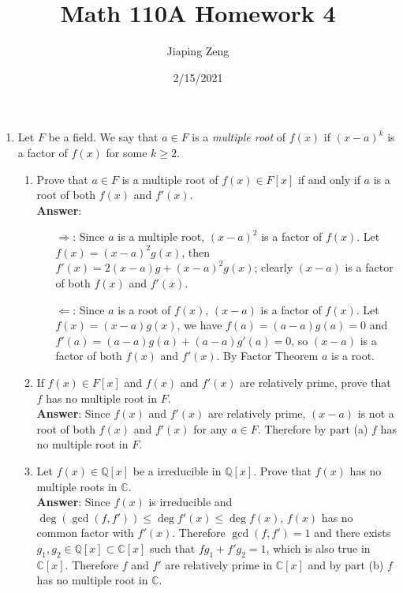 \documentclass{article}
\title{Math 110A Homework 4}
\date{2/15/2021}
\author{Jiaping Zeng}
\begin{document}
\maketitle

\begin{enumerate}
      \item Let $F$ be a field. We say that $a\in F$ is a \textit{multiple root} of $f(x)$ if $(x-a)^k$ is a factor of $f(x)$ for some $k\geq 2$.
            \begin{enumerate}
                  \item Prove that $a\in F$ is a multiple root of $f(x)\in F[x]$ if and only if $a$ is a root of both $f(x)$ and $f'(x)$.\\
                        \textbf{Answer}:
                        \begin{itemize}
                              \item [$\Rightarrow$:] Since $a$ is a multiple root, $(x-a)^2$ is a factor of $f(x)$. Let $f(x)=(x-a)^2g(x)$, then $f'(x)=2(x-a)g+(x-a)^2g(x)$; clearly $(x-a)$ is a factor of both $f(x)$ and $f'(x)$.
                              \item [$\Leftarrow$:] Since $a$ is a root of $f(x)$, $(x-a)$ is a factor of $f(x)$. Let $f(x)=(x-a)g(x)$, we have $f(a)=(a-a)g(a)=0$ and $f'(a)=(a-a)g(a)+(a-a)g'(a)=0$, so $(x-a)$ is a factor of both $f(x)$ and $f'(x)$. By Factor Theorem $a$ is a root.
                        \end{itemize}
                  \item If $f(x)\in F[x]$ and $f(x)$ and $f'(x)$ are relatively prime, prove that $f$ has no multiple root in $F$.\\
                        \textbf{Answer}: Since $f(x)$ and $f'(x)$ are relatively prime, $(x-a)$ is not a root of both $f(x)$ and $f'(x)$ for any $a\in F$. Therefore by part (a) $f$ has no multiple root in $F$.
                  \item Let $f(x)\in\mathbb{Q}[x]$ be a irreducible in $\mathbb{Q}[x]$. Prove that $f(x)$ has no multiple roots in $\mathbb{C}$.\\
                        \textbf{Answer}: Since $f(x)$ is irreducible and $\deg(\gcd(f,f'))\leq\deg f'(x)\leq\deg f(x)$, $f(x)$ has no common factor with $f'(x)$. Therefore $\gcd(f,f')=1$ and there exists $g_1,g_2\in\mathbb{Q}[x]\subset\mathbb{C}[x]$ such that $fg_1+f'g_2=1$, which is also true in $\mathbb{C}[x]$. Therefore $f$ and $f'$ are relatively prime in $\mathbb{C}[x]$ and by part (b) $f$ has no multiple root in $\mathbb{C}$.

\end{enumerate}
\end{enumerate}
\end{document}
